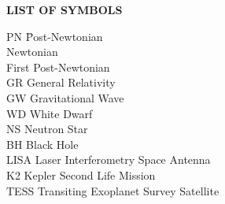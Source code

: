 {}

\begin{center}
{\Large \textbf{LIST OF SYMBOLS}}
\end{center}

\newcommand{\Ab}[2]{\noindent  #1 \> #2 \\}
\newcommand{\Abi}[2]{\noindent #1 \hspace{1.5cm} \= #2 \\}

\begin{tabbing}
\Abi{PN}{Post-Newtonian}
\Ab{}{Newtonian}
\Ab{}{First Post-Newtonian}
\Ab{GR}{General Relativity}
\Ab{GW}{Gravitational Wave}
\Ab{WD}{White Dwarf}
\Ab{NS}{Neutron Star}
\Ab{BH}{Black Hole}
\Ab{LISA}{Laser Interferometry Space Antenna}
\Ab{K2}{Kepler Second Life Mission}
\Ab{TESS}{Transiting Exoplanet Survey Satellite}
\end{tabbing}

\clearpage
